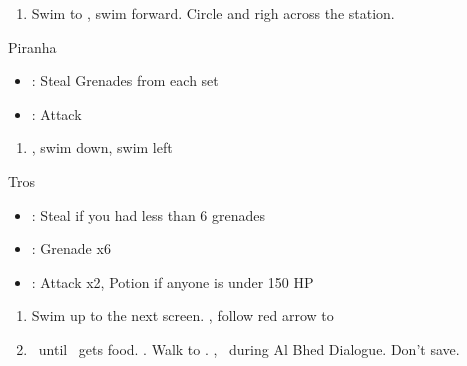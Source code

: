 \begin{enumerate}[resume]
	\item Swim to \save, swim forward. Circle and righ across the station.
\end{enumerate}
\begin{battle}{Piranha}
	\begin{itemize}
		\item \rikku: Steal Grenades from each set
		\item \tidus: Attack
	\end{itemize}
\end{battle}
\begin{enumerate}[resume]
	\item \cs, swim down, swim left
\end{enumerate}
\begin{battle}[2200]{Tros}
	\begin{itemize}
		\item \rikku: Steal if you had less than 6 grenades
		\item \rikku: Grenade x6
		\item \tidus: Attack x2, Potion if anyone is under 150 HP
	\end{itemize}
\end{battle}
\begin{enumerate}[resume]
	\item Swim up to the next screen. \cs, follow red arrow to \cs[0:50]
	\item \sd\ until \tidus \ gets food. \cs[3:00]. Walk to \rikku. \cs[2:30], \sd\ during Al Bhed Dialogue. Don't save.
\end{enumerate}